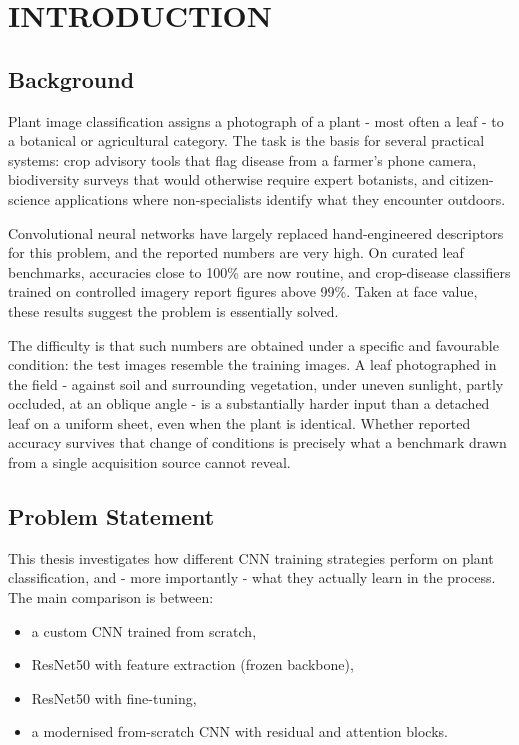 \documentclass[12pt,a4paper]{article}
\begin{document}
\vspace{1em}

\clearpage
{}

\section{INTRODUCTION}
\label{sec:intro}
\subsection{Background}
Plant image classification assigns a photograph of a plant - most often a leaf - to a botanical or agricultural category. The task is the basis for several practical systems: crop advisory tools that flag disease from a farmer's phone camera, biodiversity surveys that would otherwise require expert botanists, and citizen-science applications where non-specialists identify what they encounter outdoors.

Convolutional neural networks have largely replaced hand-engineered descriptors for this problem, and the reported numbers are very high. On curated leaf benchmarks, accuracies close to 100\% are now routine, and crop-disease classifiers trained on controlled imagery report figures above 99\%. Taken at face value, these results suggest the problem is essentially solved.

The difficulty is that such numbers are obtained under a specific and favourable condition: the test images resemble the training images. A leaf photographed in the field - against soil and surrounding vegetation, under uneven sunlight, partly occluded, at an oblique angle - is a substantially harder input than a detached leaf on a uniform sheet, even when the plant is identical. Whether reported accuracy survives that change of conditions is precisely what a benchmark drawn from a single acquisition source cannot reveal.

\subsection{Problem Statement}
This thesis investigates how different CNN training strategies perform on plant classification, and - more importantly - what they actually learn in the process. The main comparison is between:
\begin{itemize}
    \item a custom CNN trained from scratch,
    \item ResNet50 with feature extraction (frozen backbone),
    \item ResNet50 with fine-tuning,
    \item a modernised from-scratch CNN with residual and attention blocks.
\end{itemize}
\end{document}
